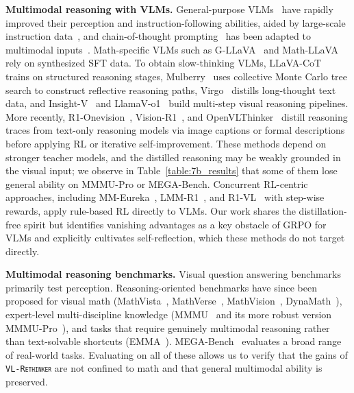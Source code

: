 \documentclass{article}
\newcommand{\model}{\texttt{\textsc{VL-Rethinker}}\xspace}
\begin{document}
\textbf{Multimodal reasoning with VLMs.} General-purpose VLMs~\cite{llava,llavaov,qwen2vl,qwen2_5_vl,internvl_2_5,deepseekvl2,gpt4o,gemini} have rapidly improved their perception and instruction-following abilities, aided by large-scale instruction data~\cite{mammothvl,infinity-mm,visualwebinstruct}, and chain-of-thought prompting~\cite{wei2022chain} has been adapted to multimodal inputs~\cite{mitra2024compositionalchainofthoughtpromptinglarge}. Math-specific VLMs such as G-LLaVA~\cite{gllava} and Math-LLaVA~\cite{shi2024mathllavabootstrappingmathematicalreasoning} rely on synthesized SFT data. To obtain slow-thinking VLMs, LLaVA-CoT~\cite{xu2024llava} trains on structured reasoning stages, Mulberry~\cite{Mulberry} uses collective Monte Carlo tree search to construct reflective reasoning paths, Virgo~\cite{virgo} distills long-thought text data, and Insight-V~\cite{insight_v} and LlamaV-o1~\cite{llamav_o1} build multi-step visual reasoning pipelines. More recently, R1-Onevision~\cite{R1OneVision}, Vision-R1~\cite{vision-r1}, and OpenVLThinker~\cite{OpenVLThinker} distill reasoning traces from text-only reasoning models via image captions or formal descriptions before applying RL or iterative self-improvement. These methods depend on stronger teacher models, and the distilled reasoning may be weakly grounded in the visual input; we observe in Table~\ref{table:7b_results} that some of them lose general ability on MMMU-Pro or MEGA-Bench. Concurrent RL-centric approaches, including MM-Eureka~\cite{mmeureka}, LMM-R1~\cite{lmm-r1}, and R1-VL~\cite{r1vl} with step-wise rewards, apply rule-based RL directly to VLMs. Our work shares the distillation-free spirit but identifies vanishing advantages as a key obstacle of GRPO for VLMs and explicitly cultivates self-reflection, which these methods do not target directly.

\textbf{Multimodal reasoning benchmarks.} Visual question answering benchmarks~\cite{vqa,goyal2017making,hudson2019gqa} primarily test perception. Reasoning-oriented benchmarks have since been proposed for visual math (MathVista~\cite{mathvista}, MathVerse~\cite{mathverse}, MathVision~\cite{mathvision}, DynaMath~\cite{dynamath}), expert-level multi-discipline knowledge (MMMU~\cite{yue2024mmmu} and its more robust version MMMU-Pro~\cite{mmmupro}), and tasks that require genuinely multimodal reasoning rather than text-solvable shortcuts (EMMA~\cite{emma}). MEGA-Bench~\cite{chen2024mega} evaluates a broad range of real-world tasks. Evaluating on all of these allows us to verify that the gains of \model are not confined to math and that general multimodal ability is preserved.
\end{document}
